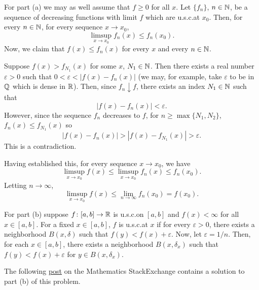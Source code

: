 \begin{solution}
  For part (a) we may as well assume that $f\geq 0$ for all $x$. Let
  $\{f_n\}$, $n\in\mathbb{N}$, be a sequence of decreasing functions with limit
  $f$ which are u.s.c.\@ at $x_0$. Then, for every $n\in\mathbb{N}$, for every
  sequence $x\to x_0$,
  \[
    \limsup_{x\to x_0}f_n(x)\leq f_n(x_0).
  \]
  Now, we claim that $f(x)\leq f_n(x)$ for every $x$ and every $n\in\mathbb{N}$.
  \begin{subproof}
    Suppose $f(x)>f_{N_1}(x)$ for some $x$, $N_1\in\mathbb{N}$. Then there exists
    a real number $\varepsilon>0$ such that $0<\varepsilon<|f(x)-f_n(x)|$
    (we may, for example, take $\varepsilon$ to be in $\mathbb{Q}$ which is dense
    in $\mathbb{R}$). Then, since $f_n\downarrow f$, there exists an index
    $N_1\in\mathbb{N}$ such that
    \[
      |f(x)-f_n(x)|<\varepsilon.
    \]
    However, since the sequence $f_n$ decreases to $f$, for
    $n\geq\max\{N_1,N_2\}$, $f_n(x)\leq f_{N_1}(x)$ so
    \[
      |f(x)-f_n(x)|>|f(x)-f_{N_1}(x)|>\varepsilon.
    \]
    This is a contradiction.
  \end{subproof}
  Having established this, for every sequence $x\to x_0$, we have
  \[
    \limsup_{x\to x_0} f(x)\leq \limsup_{x\to x_0} f_n(x)\leq f_n(x_0).
  \]
  Letting $n\to\infty$,
  \[
    \limsup_{x\to x_0} f(x)\leq \lim_{n\to\infty}f_n(x_0)=f(x_0).
  \]

  For part (b) suppose $f\colon [a,b]\to\mathbb{R}$ is u.s.c.\@ on $[a,b]$ and
  $f(x)<\infty$ for all $x\in [a,b]$. For a fixed $x\in[a,b]$, $f$ is
  u.s.c.\@ at $x$ if for every $\varepsilon>0$, there exists a neighborhood
  $B(x,\delta)$ such that $f(y)<f(x)+\varepsilon$. Now, let
  $\varepsilon=1/n$. Then, for each $x\in [a,b]$, there exists a
  neighborhood $B(x,\delta_x)$ such that $f(y)<f(x)+\varepsilon$ for
  $y\in B(x,\delta_x)$.

  The following
  \href{http://math.stackexchange.com/questions/462534/recognizing-uppersemicontinuous-function-as-a-pointwise-decreasing-limit}{post}
  on the Mathematics \textsf{StackExchange} contains a solution to part (b)
  of this problem.


\end{solution}
